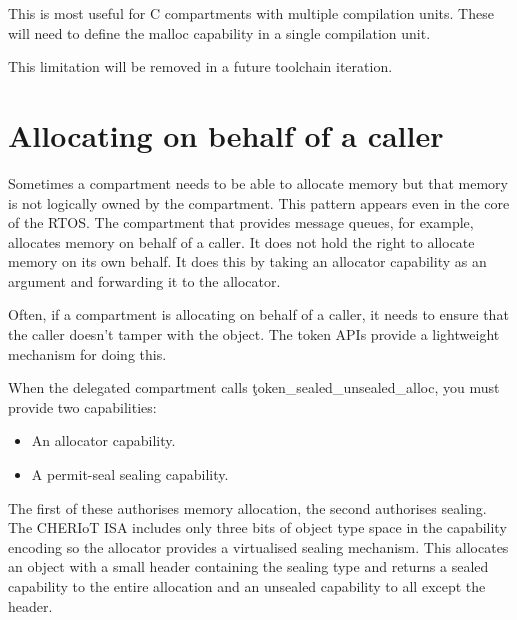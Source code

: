 This is most useful for C compartments with multiple compilation units.
These will need to define the malloc capability in a single compilation unit.

\begin{note}
This limitation will be removed in a future toolchain iteration.
\end{note}

\section[label=token_apis]{Allocating on behalf of a caller}

Sometimes a compartment needs to be able to allocate memory but that memory is not logically owned by the compartment.
This pattern appears even in the core of the RTOS.
The compartment that provides message queues, for example, allocates memory on behalf of a caller. 
It does not hold the right to allocate memory on its own behalf.
It does this by taking an allocator capability as an argument and forwarding it to the allocator.

Often, if a compartment is allocating on behalf of a caller, it needs to ensure that the caller doesn't tamper with the object.
The token APIs provide a lightweight mechanism for doing this.




When the delegated compartment calls \c{token_sealed_unsealed_alloc}, you must provide two capabilities:

\begin{itemize}
	\item{An allocator capability.}
	\item{A permit-seal sealing capability.}
\end{itemize}

The first of these authorises memory allocation, the second authorises sealing.
The CHERIoT ISA includes only three bits of object type space in the capability encoding so the allocator provides a virtualised sealing mechanism.
This allocates an object with a small header containing the sealing type and returns a sealed capability to the entire allocation and an unsealed capability to all except the header.

